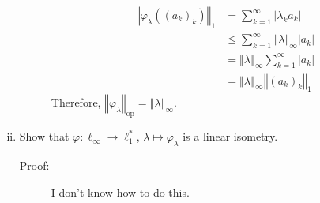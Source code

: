 \documentclass[8pt]{extarticle}
\newcommand{\norm}[1]{\left\Vert #1\right\Vert}
\begin{document}
\begin{enumerate}[(i)]
\begin{description}
          \begin{align*}
            \norm{\varphi_{\lambda}((a_k)_k)}_{1} &= \sum_{k=1}^{\infty}|\lambda_ka_k|\\
                                                  &\leq \sum_{k=1}^{\infty}\norm{\lambda}_{\infty}|a_k|\\
                                                  &= \norm{\lambda}_{\infty}\sum_{k=1}^{\infty}|a_k|\\
                                                  &= \norm{\lambda}_{\infty}\norm{(a_k)_k}_1
          \end{align*}
          Therefore, $\norm{\varphi_{\lambda}}_{\text{op}} = \norm{\lambda}_{\infty}$.
      \end{description}
    \item Show that $\varphi: \ell_{\infty}\rightarrow \ell_{1}^{\ast}$, $\lambda \mapsto \varphi_{\lambda}$ is a linear isometry.
      \begin{description}
        \item[Proof:] I don't know how to do this.
      \end{description}
  \end{enumerate}
\end{document}
